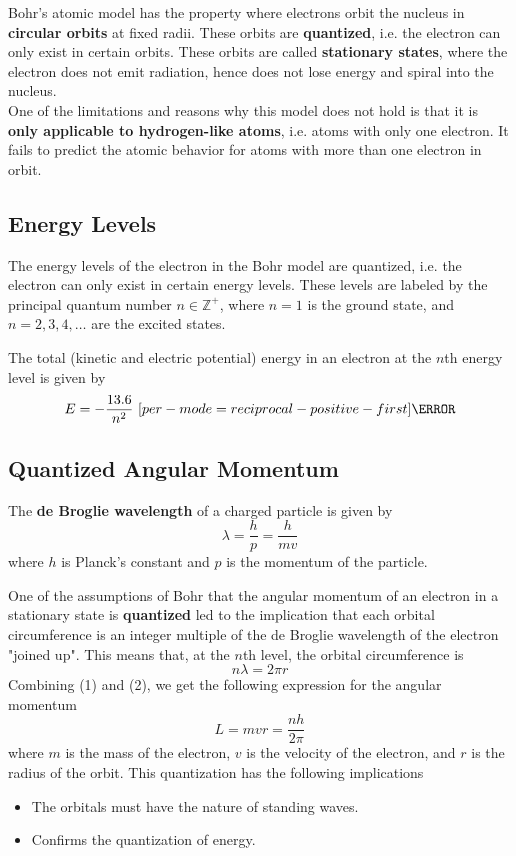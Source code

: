 \documentclass[a4paper,12pt]{article}
\let\oldsi\si
\renewcommand{\si}[1]{\oldsi[per-mode=reciprocal-positive-first]{#1}}
\newcommand{\lb}{\\[8pt]}
\begin{document}
Bohr's atomic model has the property where electrons orbit the nucleus in \textbf{circular orbits} at fixed radii. These orbits are \textbf{quantized}, i.e. the electron can only exist in certain orbits. These orbits are called \textbf{stationary states}, where the electron does not emit radiation, hence does not lose energy and spiral into the nucleus.\lb
One of the limitations and reasons why this model does not hold is that it is \textbf{only applicable to hydrogen-like atoms}, i.e. atoms with only one electron. It fails to predict the atomic behavior for atoms with more than one electron in orbit.

\subsection{Energy Levels}

The energy levels of the electron in the Bohr model are quantized, i.e. the electron can only exist in certain energy levels. These levels are labeled by the principal quantum number $n \in \mathbb{Z}^+$, where $n = 1$ is the ground state, and $n = 2, 3, 4, \ldots$ are the excited states.

\begin{figure}[H]
  \centering
  
\end{figure}

The total (kinetic and electric potential) energy in an electron at the $n$th energy level is given by $$E = -\frac{13.6}{n^2}\text{ } \si{\eV}$$

\pagebreak

\subsection{Quantized Angular Momentum}

The \textbf{de Broglie wavelength} of a charged particle is given by \begin{equation}
  \lambda = \frac{h}{p} = \frac{h}{mv}
\end{equation} where $h$ is Planck's constant and $p$ is the momentum of the particle.

One of the assumptions of Bohr that the angular momentum of an electron in a stationary state is \textbf{quantized} led to the implication that each orbital circumference is an integer multiple of the de Broglie wavelength of the electron "joined up". This means that, at the $n$th level, the orbital circumference is \begin{equation}
  n\lambda = 2\pi r
\end{equation}
Combining (1) and (2), we get the following expression for the angular momentum\begin{equation}
  L = mvr = \frac{nh}{2\pi}
\end{equation} where $m$ is the mass of the electron, $v$ is the velocity of the electron, and $r$ is the radius of the orbit.
This quantization has the following implications
\begin{itemize}
  \item The orbitals must have the nature of standing waves.
  \item Confirms the quantization of energy.
\end{itemize}


\pagebreak
\end{document}
